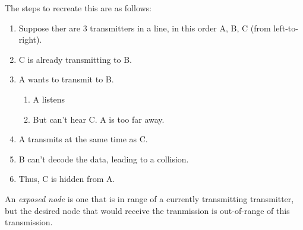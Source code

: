 The steps to recreate this are as follows:
\begin{enumerate}[noitemsep]
\item Suppose ther are 3 transmitters in a line, in this order A, B, C (from left-to-right).
\item C is already transmitting to B.
\item A wants to transmit to B.
  \begin{enumerate}[noitemsep]
  \item A listens
  \item But can't hear C. A is too far away.
  \end{enumerate}

\item A transmits at the same time as C.
\item B can't decode the data, leading to a collision.
\item Thus, C is hidden from A.
\end{enumerate}

\begin{definition}\label{def:Exposed_Node}
  An \emph{exposed node} is one that is in range of a currently transmitting transmitter, but the desired node that would receive the tranmission is out-of-range of this transmission.
\end{definition}


